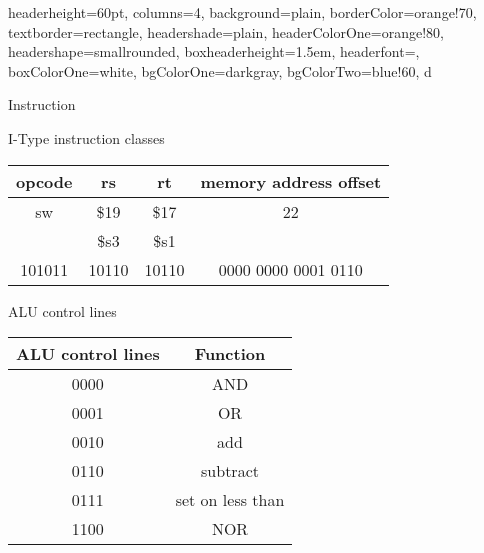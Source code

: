 \documentclass[landscape,fontscale=1,margin=0.2cm,paperwidth=60truecm, paperheight=34truecm,debug]{baposter}
\begin{document}
\begin{poster}{
  headerheight=60pt,
  columns=4,
  background=plain,
  borderColor=orange!70,
  textborder=rectangle,
  headershade=plain,
  headerColorOne=orange!80,
  headershape=smallrounded,
  boxheaderheight=1.5em,
  headerfont={},
  boxColorOne=white,
  bgColorOne=darkgray,
  bgColorTwo=blue!60,
}{}{\Large{\color{white}{Single Cycle Datapath}}}{}{d}

\begin{posterbox}[column=0]{Instruction}

\end{posterbox}
\begin{posterbox}[column=0,textborder=rounded]{I-Type instruction classes}
\begin{center}
\begin{tabular}{|c|c|c|c|}
\hline
opcode & rs & rt & memory address offset\\\hline\hline
sw & \$19 & \$17 & 22\\\hline
& \$s3 & \$s1&\\\hline
101011 & 10110 & 10110 & 0000 0000 0001 0110\\\hline
\end{tabular}

\end{center}
\end{posterbox}
\begin{posterbox}[column=1,textborder=rounded]{ALU control lines}
\begin{center}
\begin{tabular}{|c|c|}
\hline
ALU control lines & Function\\\hline
0000 & AND\\\hline
0001 & OR\\\hline
0010 & add\\\hline
0110 & subtract\\\hline
0111 & set on less than\\\hline
1100 & NOR\\\hline
\end{tabular}
\end{center}
\end{posterbox}
\end{poster}
\end{document}
